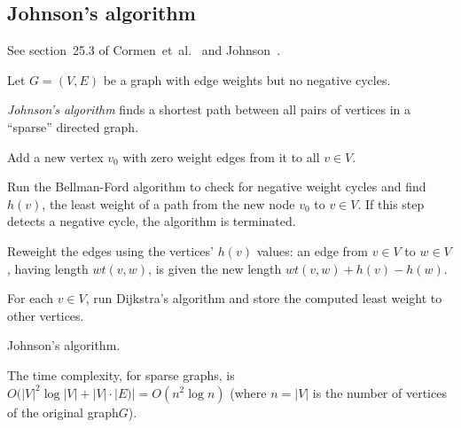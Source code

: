 
\subsection{Johnson's algorithm}

See section~25.3 of Cormen~et~al.~\cite{CormenEtAl2001} and
Johnson~\cite{Johnson1977}.

Let $G=(V,E)$ be a graph with edge weights but no negative cycles.


{\it Johnson's algorithm} finds a shortest path between all pairs of
vertices in a ``sparse'' directed graph. 

%
%
%



\begin{algorithm}[!htpb]
\SetLine
\dontprintsemicolon  %
\BlankLine
Add a new vertex $v_0$ with zero weight edges from it to all $v\in V$.\;

Run the Bellman-Ford algorithm to check for negative weight cycles
and find $h(v)$, 
the least weight of a path from the new node $v_0$ to $v\in V$. 
If this step detects a negative cycle, the algorithm is terminated.\;

Reweight the edges using the vertices' $h(v)$ values: an edge from 
$v\in V$ to $w\in V$, having length $wt(v,w)$, is given the new length 
$wt(v,w) + h(v) - h(w)$.\;

For each $v\in V$, run Dijkstra's algorithm and store the computed 
least weight to other vertices. \;

\caption{Johnson's algorithm.}
\label{alg:graph_algorithms:johnson}
\end{algorithm}


The time complexity, for sparse graphs, is $O(|V|^2\log |V| + |V|\cdot
|E)|=O(n^2\log n)$ (where $n=|V|$ is the number of vertices of the
original graph$G$).
